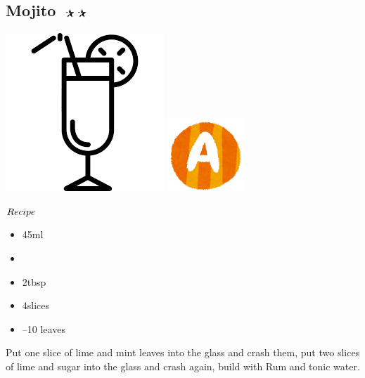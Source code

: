 \subsection{Mojito $\openbigstar\openbigstar$}
\vspace{-7.5mm}
\hspace{38mm}
\includegraphics[scale=.07]{cocktail_glass_tall.png}
\includegraphics[scale=.12]{capital_a.png}
\vspace{2.5mm}
\begin{itembox}[l]{\boldmath $Recipe$}
\begin{itemize}
\setlength{\parskip}{0cm}
\setlength{\itemsep}{0cm}
\item \rum 45ml
\item \tw
\item \sugar 2tbsp
\item \lime 4slices
\item {}--10 leaves
\end{itemize}
\vspace{-4mm}
Put one slice of lime and mint leaves into the glass and crash them, put two slices of lime and sugar into the glass and crash again, build with Rum and tonic water.
\end{itembox}

